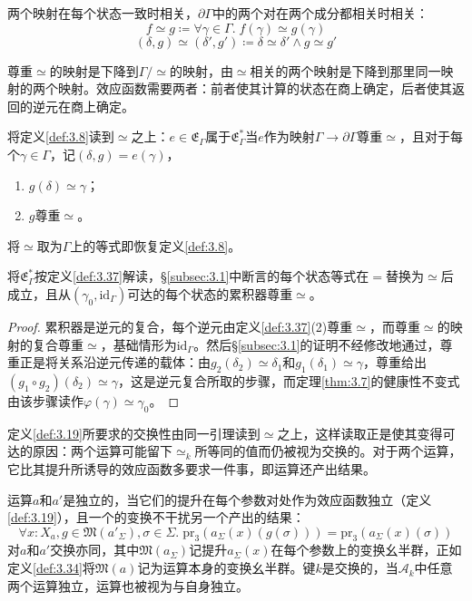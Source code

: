 两个映射在每个状态一致时相关，$\partial\Gamma$中的两个对在两个成分都相关时相关：
\begin{equation}\label{eq:3.34}
f \simeq g \coloneqq \forall \gamma \in \Gamma.\; f(\gamma) \simeq g(\gamma)
\end{equation}
\[
(\delta, g) \simeq (\delta', g') \coloneqq \delta \simeq \delta' \wedge g \simeq g'
\]

尊重$\simeq$的映射是下降到$\Gamma / \simeq$的映射，由$\simeq$相关的两个映射是下降到那里同一映射的两个映射。效应函数需要两者：前者使其计算的状态在商上确定，后者使其返回的逆元在商上确定。

\begin{definition}\label{def:3.37}
将定义\ref{def:3.8}读到$\simeq$之上：$e \in \mathfrak{E}_\Gamma$属于$\mathfrak{E}^*_\Gamma$当$e$作为映射$\Gamma \to \partial\Gamma$尊重$\simeq$，且对于每个$\gamma \in \Gamma$，记$(\delta, g) = e(\gamma)$，
\begin{enumerate}
\item $g(\delta) \simeq \gamma$；
\item $g$尊重$\simeq$。
\end{enumerate}
\end{definition}

将$\simeq$取为$\Gamma$上的等式即恢复定义\ref{def:3.8}。

\begin{lemma}\label{lem:3.38}
将$\mathfrak{E}^*_\Gamma$按定义\ref{def:3.37}解读，\S\ref{subsec:3.1}中断言的每个状态等式在$=$替换为$\simeq$后成立，且从$(\gamma_0, \mathrm{id}_\Gamma)$可达的每个状态的累积器尊重$\simeq$。
\end{lemma}

\begin{proof}
累积器是逆元的复合，每个逆元由定义\ref{def:3.37}(2)尊重$\simeq$，而尊重$\simeq$的映射的复合尊重$\simeq$，基础情形为$\mathrm{id}_\Gamma$。然后\S\ref{subsec:3.1}的证明不经修改地通过，尊重正是将关系沿逆元传递的载体：由$g_2(\delta_2) \simeq \delta_1$和$g_1(\delta_1) \simeq \gamma$，尊重给出$(g_1 \circ g_2)(\delta_2) \simeq \gamma$，这是逆元复合所取的步骤，而定理\ref{thm:3.7}的健康性不变式由该步骤读作$\varphi(\gamma) \simeq \gamma_0$。
\end{proof}

定义\ref{def:3.19}所要求的交换性由同一引理读到$\simeq$之上，这样读取正是使其变得可达的原因：两个运算可能留下$\simeq_k$所等同的值而仍被视为交换的。对于两个运算，它比其提升所诱导的效应函数多要求一件事，即运算还产出结果。

\begin{definition}\label{def:3.39}
运算$a$和$a'$是独立的，当它们的提升在每个参数对处作为效应函数独立（定义\ref{def:3.19}），且一个的变换不干扰另一个产出的结果：
\begin{equation}\label{eq:3.35}
\forall x: X_a, g \in \mathfrak{M}(a'_\Sigma), \sigma \in \Sigma.\; \mathrm{pr}_3(a_\Sigma(x)(g(\sigma))) = \mathrm{pr}_3(a_\Sigma(x)(\sigma))
\end{equation}
对$a$和$a'$交换亦同，其中$\mathfrak{M}(a_\Sigma)$记提升$a_\Sigma(x)$在每个参数上的变换幺半群，正如定义\ref{def:3.34}将$\mathfrak{M}(a)$记为运算本身的变换幺半群。键$k$是交换的，当$\mathcal{A}_k$中任意两个运算独立，运算也被视为与自身独立。
\end{definition}

